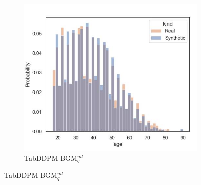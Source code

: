 \begin{figure}[H]
\begin{subfigure}{0.3\textwidth}
		\centering
		\includegraphics[width=\textwidth]{images/dist_age/tab-ddpm-bgm.jpg}
		\caption{TabDDPM-BGM$^{ml}_q$}
	\end{subfigure}



\end{figure}
